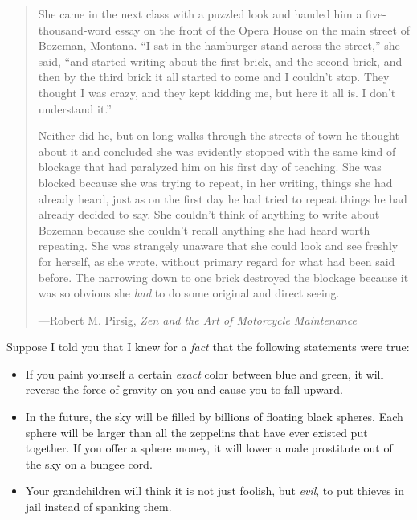 \begin{quotation}
{
 She came in the next class with a puzzled look and handed him a
five-thousand-word essay on the front of the Opera House on the main
street of Bozeman, Montana. ``I sat in the hamburger
stand across the street,'' she said,
``and started writing about the first brick, and the
second brick, and then by the third brick it all started to come and I
couldn't stop. They thought I was crazy, and they kept
kidding me, but here it all is. I don't understand
it.''}

{
 Neither did he, but on long walks through the streets of town he
thought about it and concluded she was evidently stopped with the same
kind of blockage that had paralyzed him on his first day of teaching.
She was blocked because she was trying to repeat, in her writing,
things she had already heard, just as on the first day he had tried to
repeat things he had already decided to say. She
couldn't think of anything to write about Bozeman
because she couldn't recall anything she had heard
worth repeating. She was strangely unaware that she could look and see
freshly for herself, as she wrote, without primary regard for what had
been said before. The narrowing down to one brick destroyed the
blockage because it was so obvious she \textit{had} to do some original
and direct seeing.}

{\raggedleft
 {}---Robert M. Pirsig,\newline
 \textit{Zen and the Art of Motorcycle Maintenance}
\par}
\end{quotation}

\myendsectiontext


\bigskip


{
 Suppose I told you that I knew for a \textit{fact} that the
following statements were true:}

\begin{itemize}
\item
{
 If you paint yourself a certain \textit{exact} color between blue
and green, it will reverse the force of gravity on you and cause you to
fall upward.}
\item
{
 In the future, the sky will be filled by billions of floating
black spheres. Each sphere will be larger than all the zeppelins that
have ever existed put together. If you offer a sphere money, it will
lower a male prostitute out of the sky on a bungee cord.}
\item
{
 Your grandchildren will think it is not just foolish, but
 \textit{evil}, to put thieves in jail instead of spanking them.}
\end{itemize}

